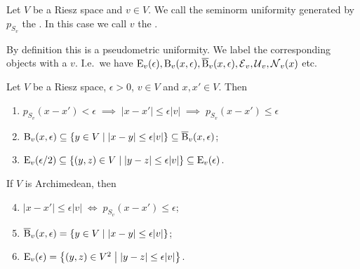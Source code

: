 \begin{definition}
Let $V$ be a Riesz space and $v\in V$. We call the seminorm uniformity generated by $p_{S_v}$ the . In this case we call $v$ the .
\end{definition}
By definition this is a pseudometric uniformity. We label the corresponding objects with a $v$. I.e.\ we have $\operatorname{E}_v(\epsilon), \operatorname{B}_v(x,\epsilon), \operatorname{\overline{B}}_v(x,\epsilon), \operatorname{\mathcal{E}}_v, \operatorname{\mathcal{U}}_v, \operatorname{\mathcal{N}}_v(x)$ etc.

\begin{lemma} \label{ballsInRieszUniformities}
Let $V$ be a Riesz space, $\epsilon > 0$, $v\in V$ and $x, x'\in V$. Then
\begin{enumerate}
\item $p_{S_v}(x-x') < \epsilon \;\implies\; |x-x'| \leq \epsilon|v| \;\implies\; p_{S_v}(x-x') \leq \epsilon$
\item $\ball_v(x,\epsilon) \subseteq \setbuilder{y\in V}{ |x-y| \leq \epsilon |v|} \subseteq \cball_v(x,\epsilon)$;
\item $\entourage_v(\epsilon/2) \subseteq \setbuilder{(y,z)\in V}{ |y-z| \leq \epsilon |v|} \subseteq \entourage_v(\epsilon)$.
\end{enumerate}
If $V$ is Archimedean, then
\begin{enumerate} \setcounter{enumi}{3}
\item $|x-x'| \leq \epsilon|v| \;\iff\; p_{S_v}(x-x') \leq \epsilon$;
\item $\cball_v(x,\epsilon) = \setbuilder{y\in V}{ |x-y| \leq \epsilon |v|}$;
\item $\entourage_v(\epsilon) = \setbuilder{(y,z)\in V^2}{|y-z| \leq \epsilon |v|}$.
\end{enumerate}
\end{lemma}
